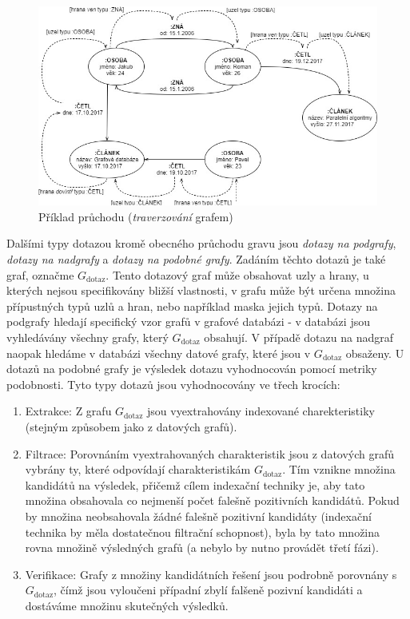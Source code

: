 \begin{figure}
\begin{center}
\includegraphics[width=14cm]{figures/traversal}
\caption{Příklad průchodu (\textit{traverzování} grafem)}
\label{fig:traversal}
\end{center}
\end{figure}

Dalšími typy dotazou kromě obecného průchodu gravu jsou \textit{dotazy na podgrafy}, \textit{dotazy na nadgrafy} a \textit{dotazy na podobné grafy}. Zadáním těchto dotazů je také graf, označme \textit{$G_\mathrm{dotaz}$}. Tento dotazový graf může obsahovat uzly a hrany, u kterých nejsou specifikovány bližší vlastnosti, v grafu může být určena množina přípustných typů uzlů a hran, nebo například maska jejich typů. Dotazy na podgrafy hledají specifický vzor grafů v grafové databázi - v databázi jsou vyhledávány všechny grafy, který \textit{$G_\mathrm{dotaz}$} obsahují. V případě dotazu na nadgraf naopak hledáme v databázi všechny datové grafy, které jsou v \textit{$G_\mathrm{dotaz}$} obsaženy. U dotazů na podobné grafy je výsledek dotazu vyhodnocován pomocí metriky podobnosti.\cite{Koutra11} Tyto typy dotazů jsou vyhodnocovány ve třech krocích: 

\begin{enumerate}
	\item{Extrakce:} Z grafu \textit{$G_\mathrm{dotaz}$} jsou vyextrahovány indexované charekteristiky (stejným způsobem jako z datových grafů).
	\item{Filtrace:} Porovnáním vyextrahovaných charakteristik jsou z datových grafů vybrány ty, které odpovídají charakteristikám \textit{$G_\mathrm{dotaz}$}. Tím vznikne množina kandidátů na výsledek, přičemž cílem indexační techniky je, aby tato množina obsahovala co nejmenší počet falešně pozitivních kandidátů. Pokud by množina neobsahovala žádné falešně pozitivní kandidáty (indexační technika by měla dostatečnou filtrační schopnost), byla by tato množina rovna množině výsledných grafů (a nebylo by nutno provádět třetí fázi). 
	\item{Verifikace:} Grafy z množiny kandidátních řešení jsou podrobně porovnány s \textit{$G_\mathrm{dotaz}$}, čímž jsou vyloučeni případní zbylí falšeně pozivní kandidáti a dostáváme množinu skutečných výsledků. 
\end{enumerate}

